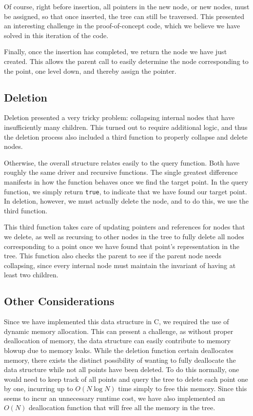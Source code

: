 \documentclass[10pt]{article}
\begin{document}
Of course, right before insertion, all pointers in the new node, or new nodes, must be assigned, so that once inserted, the tree can still be traversed. This presented an interesting challenge in the proof-of-concept code, which we believe we have solved in this iteration of the code.

Finally, once the insertion has completed, we return the node we have just created. This allows the parent call to easily determine the node corresponding to the point, one level down, and thereby assign the pointer.

\subsection{Deletion}
Deletion presented a very tricky problem: collapsing internal nodes that have insufficiently many children. This turned out to require additional logic, and thus the deletion process also included a third function to properly collapse and delete nodes.

Otherwise, the overall structure relates easily to the query function. Both have roughly the same driver and recursive functions. The single greatest difference manifests in how the function behaves once we find the target point. In the query function, we simply return {\tt true}, to indicate that we have found our target point. In deletion, however, we must actually delete the node, and to do this, we use the third function.

This third function takes care of updating pointers and references for nodes that we delete, as well as recursing to other nodes in the tree to fully delete all nodes corresponding to a point once we have found that point's representation in the tree. This function also checks the parent to see if the parent node needs collapsing, since every internal node must maintain the invariant of having at least two children.

\subsection{Other Considerations}
Since we have implemented this data structure in C, we required the use of dynamic memory allocation. This can present a challenge, as without proper deallocation of memory, the data structure can easily contribute to memory blowup due to memory leaks. While the deletion function certain deallocates memory, there exists the distinct possibility of wanting to fully deallocate the data structure while not all points have been deleted. To do this normally, one would need to keep track of all points and query the tree to delete each point one by one, incurring up to $O(N\log N)$ time simply to free this memory. Since this seems to incur an unnecessary runtime cost, we have also implemented an $O(N)$ deallocation function that will free all the memory in the tree.
\end{document}
